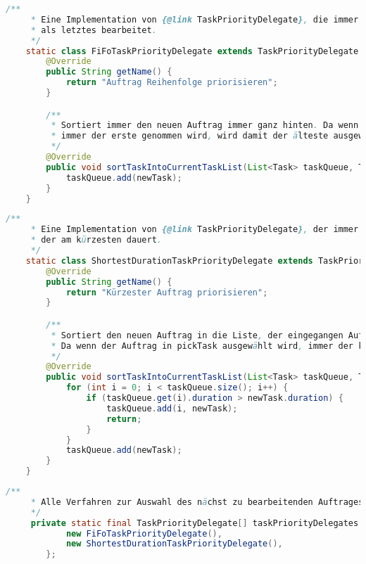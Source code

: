 \documentclass[a4paper,10pt,ngerman]{scrartcl}
\begin{document}
\begin{lstlisting}[frame=single,language=Java,title=Klasse FiFoTaskPriorityDelegate,breaklines=true]
    /**
     * Eine Implementation von {@link TaskPriorityDelegate}, die immer den Auftrag der als neuestes eingegangen ist,
     * als letztes bearbeitet.
     */
    static class FiFoTaskPriorityDelegate extends TaskPriorityDelegate {
        @Override
        public String getName() {
            return "Auftrag Reihenfolge priorisieren";
        }

        /**
         * Sortiert immer den neuen Auftrag immer ganz hinten. Da wenn der Auftrag in pickTask ausgewählt wird,
         * immer der erste genommen wird, wird damit der älteste ausgewählt.
         */
        @Override
        public void sortTaskIntoCurrentTaskList(List<Task> taskQueue, Task newTask) {
            taskQueue.add(newTask);
        }
    }
	\end{lstlisting}
\begin{lstlisting}[frame=single,language=Java,title=Klasse ShortestDurationTaskPriorityDelegate,breaklines=true]
	/**
     * Eine Implementation von {@link TaskPriorityDelegate}, der immer den Auftrag als nächstes bearbeitet,
     * der am kürzesten dauert.
     */
    static class ShortestDurationTaskPriorityDelegate extends TaskPriorityDelegate {
        @Override
        public String getName() {
            return "Kürzester Auftrag priorisieren";
        }

        /**
         * Sortiert den neuen Auftrag in die Liste, der eingegangen Aufträge, ein, nach absteigender Dauer.
         * Da wenn der Auftrag in pickTask ausgewählt wird, immer der kürzeste genommen wird.
         */
        @Override
        public void sortTaskIntoCurrentTaskList(List<Task> taskQueue, Task newTask) {
            for (int i = 0; i < taskQueue.size(); i++) {
                if (taskQueue.get(i).duration > newTask.duration) {
                    taskQueue.add(i, newTask);
                    return;
                }
            }
            taskQueue.add(newTask);
        }
    }
	\end{lstlisting}
\begin{lstlisting}[frame=single,language=Java,title=Konstante taskPriorityDelegates,breaklines=true]
	/**
     * Alle Verfahren zur Auswahl des nächst zu bearbeitenden Auftrages.
     */
     private static final TaskPriorityDelegate[] taskPriorityDelegates = new TaskPriorityDelegate[]{
            new FiFoTaskPriorityDelegate(),
            new ShortestDurationTaskPriorityDelegate(),
    	};
	\end{lstlisting}
\end{document}
